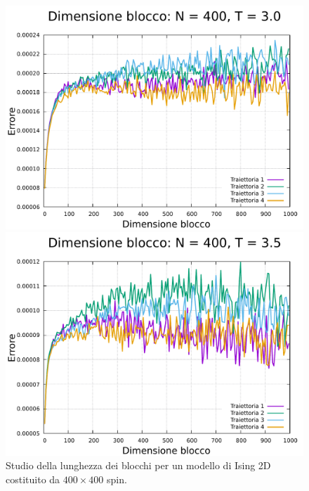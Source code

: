 \begin{figure}[htbp]
    \begin{minipage}{0.45\textwidth}  
      \centering
      \includegraphics[page=1, width=\textwidth]{Immagini/simIsing2D/metro/lblk/err_400_3.0.pdf}
      \caption{$T\,=\,3.0$}
    \end{minipage}\hfill
    \begin{minipage}{0.45\textwidth}  
      \centering
      \includegraphics[page=1, width=\textwidth]{Immagini/simIsing2D/metro/lblk/err_400_3.5.pdf}
      \caption{$T\,=\,3.5$}
    \end{minipage}
    \caption{Studio della lunghezza dei blocchi per un modello di Ising 2D costituito da $400 \times 400$ spin.}
\end{figure}

